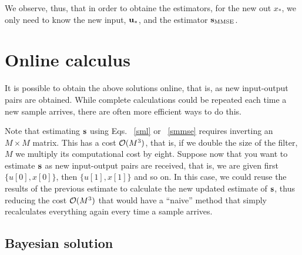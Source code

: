 We observe, thus, that in order to obtaine the estimators, for the new out $x_*$, we only need to know the new input, ${\mathbf u}_*$, and the estimator ${\mathbf s}_\text{MMSE}$.


\section{Online calculus}

It is possible to obtain the above solutions online, that is, as new input-output pairs are obtained. While complete calculations could be repeated each time a new sample arrives, there are often more efficient ways to do this.

Note that estimating ${\mathbf s}$ using Eqs. ~\eqref{sml} or ~\eqref{smmse} requires inverting an $M \times M$ matrix. This has a cost ${\mathcal O} (M^3)$, that is, if we double the size of the filter, $M$ we multiply its computational cost by eight. Suppose now that you want to estimate ${\mathbf s}$ as new input-output pairs are received, that is, we are given first $\{u[0], x[0] \}$, then $\{u[1], x[1] \} $ and so on. In this case, we could reuse the results of the previous estimate to calculate the new updated estimate of ${\mathbf s}$, thus reducing the cost ${\mathcal O}(M^3) $ that would have a ``naive'' method that simply recalculates everything again every time a sample arrives.

\subsection{Bayesian solution}

